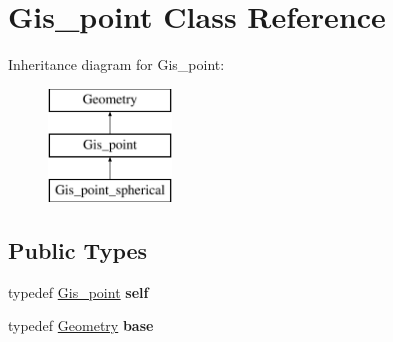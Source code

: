 \hypertarget{classGis__point}{}\section{Gis\+\_\+point Class Reference}
\label{classGis__point}
Inheritance diagram for Gis\+\_\+point\+:\begin{figure}[H]
\begin{center}
\leavevmode
\includegraphics[height=3.000000cm]{classGis__point}
\end{center}
\end{figure}
\subsection*{Public Types}
\begin{DoxyCompactItemize}
\item 
\mbox{\label{classGis__point_a0c92d4c85bfd3d6686bb7e0fdc1e09e8}} 
typedef \mbox{\hyperlink{classGis__point}{Gis\+\_\+point}} {\bfseries self}
\item 
\mbox{\label{classGis__point_ab65888e9834a69f94a89e0fba77a8ab5}} 
typedef \mbox{\hyperlink{classGeometry}{Geometry}} {\bfseries base}
\end{DoxyCompactItemize}
